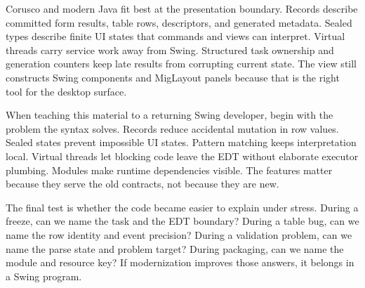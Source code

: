 Corusco and modern Java fit best at the presentation boundary. Records describe committed form results, table rows, descriptors, and generated metadata. Sealed types describe finite UI states that commands and views can interpret. Virtual threads carry service work away from Swing. Structured task ownership and generation counters keep late results from corrupting current state. The view still constructs Swing components and MigLayout panels because that is the right tool for the desktop surface.

When teaching this material to a returning Swing developer, begin with the problem the syntax solves. Records reduce accidental mutation in row values. Sealed states prevent impossible UI states. Pattern matching keeps interpretation local. Virtual threads let blocking code leave the EDT without elaborate executor plumbing. Modules make runtime dependencies visible. The features matter because they serve the old contracts, not because they are new.

The final test is whether the code became easier to explain under stress. During a freeze, can we name the task and the EDT boundary? During a table bug, can we name the row identity and event precision? During a validation problem, can we name the parse state and problem target? During packaging, can we name the module and resource key? If modernization improves those answers, it belongs in a Swing program.
